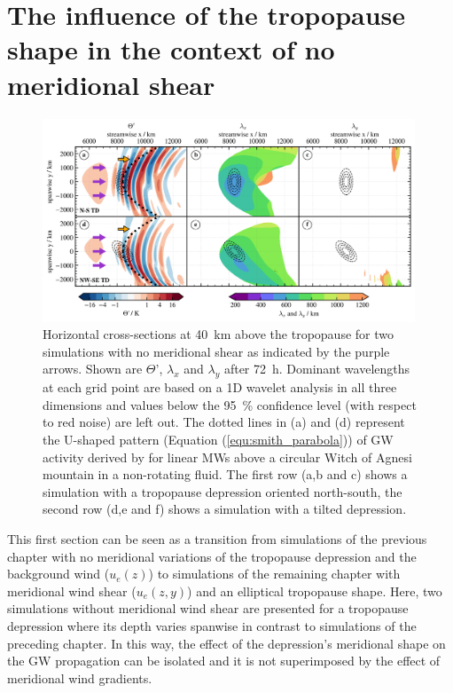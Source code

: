 \section{The influence of the tropopause shape in the context of no meridional shear}
\label{sec:3D_noshear}
\begin{figure}[t]
    \centering
    \includegraphics[width=0.99\textwidth]{figures_3D/waveletAna_overview_noShear.png}
    \caption{Horizontal cross-sections at \SI{40}{\kilo\meter} above the tropopause for two simulations with no meridional shear as indicated by the purple arrows. Shown are $\Theta$', $\lambda_x$ and $\lambda_y$ after \SI{72}{\hour}. Dominant wavelengths at each grid point are based on a 1D wavelet analysis in all three dimensions and values below the \SI{95}{\percent} confidence level (with respect to red noise) are left out. The dotted lines in (a) and (d) represent the U-shaped pattern (Equation (\ref{equ:smith_parabola})) of GW activity derived by \textcite[]{smith_linear_1980} for linear MWs above a circular Witch of Agnesi mountain in a non-rotating fluid. The first row (a,b and c) shows a simulation with a tropopause depression oriented north-south, the second row (d,e and f) shows a simulation with a tilted depression.}
    \label{fig:waveletAna_noShear}
\end{figure}
This first section can be seen as a transition from simulations of the previous chapter with no meridional variations of the tropopause depression and the background wind ($u_e(z)$) to simulations of the remaining chapter with meridional wind shear ($u_e(z,y)$) and an elliptical tropopause shape. Here, two simulations without meridional wind shear are presented for a tropopause depression where its depth varies spanwise in contrast to simulations of the preceding chapter. In this way, the effect of the depression's meridional shape on the GW propagation can be isolated and it is not superimposed by the effect of meridional wind gradients.

